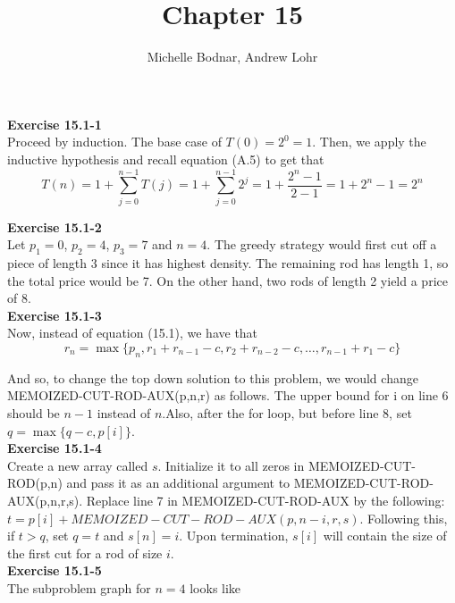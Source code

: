 \documentclass{article}
\title{Chapter 15}
\author{Michelle Bodnar, Andrew Lohr}
\begin{document}
\maketitle

\noindent\textbf{Exercise 15.1-1}\\

Proceed by induction. The base case of $T(0) = 2^0 = 1$. Then, we apply the inductive hypothesis and recall equation (A.5) to get that
\[
T(n) = 1+ \sum_{j=0}^{n-1} T(j) = 1+  \sum_{j=0}^{n-1} 2^j = 1 + \frac{2^{n}-1}{2-1} = 1+ 2^n-1 = 2^n
\]

\noindent\textbf{Exercise 15.1-2}\\

Let $p_1 = 0$, $p_2 = 4$, $p_3 = 7$ and $n=4$.  The greedy strategy would first cut off a piece of length 3 since it has highest density.  The remaining rod has length 1, so the total price would be 7. On the other hand, two rods of length 2 yield a price of 8. \\


\noindent\textbf{Exercise 15.1-3}\\

Now, instead of equation (15.1), we have that
\[
r_n = \max\{p_n,r_1+r_{n-1}-c,r_2+r_{n-2}-c,\ldots,r_{n-1}+r_{1}-c\}
\]

And so, to change the top down solution to this problem, we would change MEMOIZED-CUT-ROD-AUX(p,n,r) as follows. The upper bound for i on line 6 should be $n-1$ instead of $n$.Also, after the for loop, but before line 8, set $q = \max\{q-c,p[i]\}$.\\

\noindent\textbf{Exercise 15.1-4}\\

Create a new array called $s$.  Initialize it to all zeros in MEMOIZED-CUT-ROD(p,n) and pass it as an additional argument to MEMOIZED-CUT-ROD-AUX(p,n,r,s).  Replace line 7 in MEMOIZED-CUT-ROD-AUX by the following: $t = p[i] + MEMOIZED-CUT-ROD-AUX(p,n-i,r,s)$.  Following this, if $t > q$, set $q=t$ and $s[n] = i$. Upon termination, $s[i]$ will contain the size of the first cut for a rod of size $i$.  \\


\noindent\textbf{Exercise 15.1-5}\\

The subproblem graph for $n=4$ looks like

\end{document}
